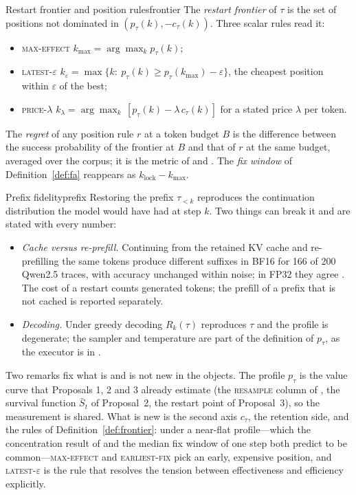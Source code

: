 \documentclass[10pt,a4paper]{article}
\begin{document}
\begin{definition}{Restart frontier and position rules}{frontier}
The \emph{restart frontier} of $\tau$ is the set of positions not dominated in $(p_\tau(k),-c_\tau(k))$. Three scalar rules read it:
\begin{itemize}[leftmargin=1.1em]
\item \textsc{max-effect} $k_{\max}=\arg\max_k p_\tau(k)$;
\item \textsc{latest-}$\varepsilon$ $k_\varepsilon=\max\{k:\ p_\tau(k)\ge p_\tau(k_{\max})-\varepsilon\}$, the cheapest position within $\varepsilon$ of the best;
\item \textsc{price-}$\lambda$ $k_\lambda=\arg\max_k\,[p_\tau(k)-\lambda\,c_\tau(k)]$ for a stated price $\lambda$ per token.
\end{itemize}
The \emph{regret} of any position rule $r$ at a token budget $B$ is the difference between the success probability of the frontier at $B$ and that of $r$ at the same budget, averaged over the corpus; it is the metric of  and . The \emph{fix window} of Definition~\ref{def:fa} reappears as $k_{\mathrm{lock}}-k_{\max}$.
\end{definition}

\begin{assumption}{Prefix fidelity}{prefix}
Restoring the prefix $\tau_{<k}$ reproduces the continuation distribution the model would have had at step $k$. Two things can break it and are stated with every number:
\begin{itemize}[leftmargin=1.1em]
\item \emph{Cache versus re-prefill.} Continuing from the retained KV cache and re-prefilling the same tokens produce different suffixes in BF16 for 166 of 200 Qwen2.5 traces, with accuracy unchanged within noise; in FP32 they agree \cite{lorup2026stagereplay}. The cost of a restart counts generated tokens; the prefill of a prefix that is not cached is reported separately.
\item \emph{Decoding.} Under greedy decoding $R_k(\tau)$ reproduces $\tau$ and the profile is degenerate; the sampler and temperature are part of the definition of $p_\tau$, as the executor is in \citet{liao2026repairs}.
\end{itemize}
\end{assumption}

Two remarks fix what is and is not new in the objects. The profile $p_\tau$ is the value curve that Proposals 1, 2 and 3 already estimate (the \textsc{resample} column of , the survival function $\bar S_t$ of Proposal~2, the restart point of Proposal~3), so the measurement is shared. What is new is the second axis $c_\tau$, the retention side, and the rules of Definition~\ref{def:frontier}: under a near-flat profile---which the concentration result of \citet{atri2026expanding} and the median fix window of one step both predict to be common---\textsc{max-effect} and \textsc{earliest-fix} pick an early, expensive position, and \textsc{latest-}$\varepsilon$ is the rule that resolves the tension between effectiveness and efficiency explicitly.
\end{document}
